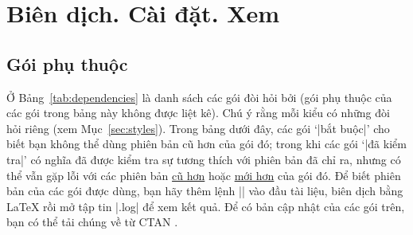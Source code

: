 
\section{\texorpdfstring{Biên dịch. Cài đặt}{Bien dich. Cai dat}. Xem}
\label{sec:compiling}


\subsection{\texorpdfstring{Gói phụ thuộc}{Goi phu thuoc}}

\label{sec:dependencies}


Ở Bảng~\vref{tab:dependencies} là danh sách các gói đòi hỏi bởi 
(gói phụ thuộc của các gói trong bảng này không được liệt kê). Chú ý rằng
mỗi kiểu có những đòi hỏi riêng (xem Mục~\vref{sec:styles}). Trong bảng dưới đây,
các gói `|bắt buộc|' cho biết bạn không thể dùng phiên bản cũ hơn của gói đó;
trong khi các gói `|đã kiểm tra|' có nghĩa  đã được kiểm tra
sự tương thích với phiên bản đã chỉ ra, nhưng có thể vẫn gặp lỗi với các
phiên bản \underline{cũ hơn} hoặc \underline{mới hơn} của gói đó.
Để biết phiên bản của các gói được dùng, bạn hãy thêm lệnh |\listfiles|
vào đầu tài liệu, biên dịch bằng \LaTeX{} rồi mở tập tin |.log| để xem
kết quả. Để có bản cập nhật của các gói trên, bạn có thể tải chúng về
từ CTAN \cite{CTAN}.%

